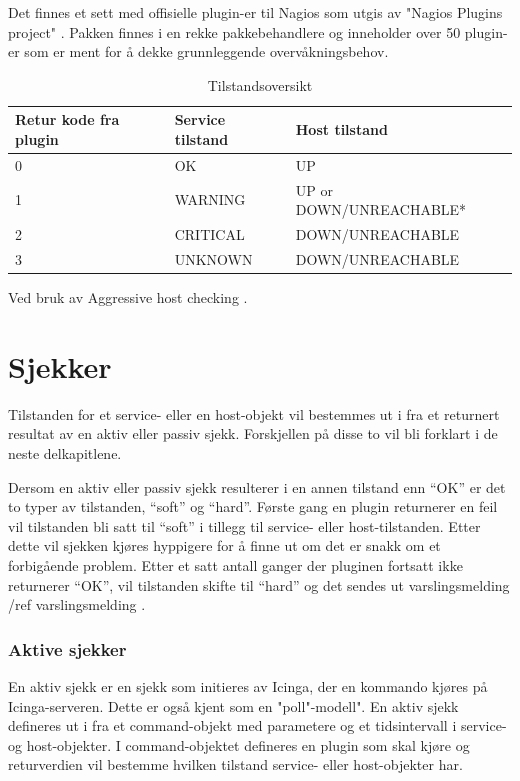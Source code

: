 Det finnes et sett med offisielle plugin-er til Nagios som utgis av "Nagios Plugins project" \cite{http://nagiosplugins.org}. Pakken finnes i en rekke pakkebehandlere og inneholder over 50 plugin-er som er ment for å dekke grunnleggende overvåkningsbehov.

\begin{table}
	\begin{center}
	\begin{threeparttable}
	\begin{tabular}{ | l | l | l |} \hline
    \textbf{Retur kode fra plugin} & \textbf{Service tilstand} & \textbf{Host tilstand} \\ \hline
	0 & OK & UP \\ \hline
	1 & WARNING & UP or DOWN/UNREACHABLE* \\ \hline
	2 & CRITICAL & DOWN/UNREACHABLE \\ \hline
	3 & UNKNOWN & DOWN/UNREACHABLE \\ \hline

	\end{tabular}
	\begin{tablenotes}
	\small
	\item *Ved bruk av Aggressive host checking \cite{icingapluginapi}.
	\end{tablenotes}
	\caption{Tilstandsoversikt}
	\label{state}
	\end{threeparttable}
	\end{center}
\end{table}

\section{Sjekker}
Tilstanden for et service- eller en host-objekt vil bestemmes ut i fra et returnert resultat av en aktiv eller passiv sjekk. Forskjellen på disse to vil bli forklart i de neste delkapitlene.

Dersom en aktiv eller passiv sjekk resulterer i en annen tilstand enn “OK” er det to typer av tilstanden, “soft” og “hard”. Første gang en plugin returnerer en feil vil tilstanden bli satt til “soft” i tillegg til service- eller host-tilstanden. Etter dette vil sjekken kjøres hyppigere for å finne ut om det er snakk om et forbigående problem. Etter et satt antall ganger der pluginen fortsatt ikke returnerer “OK”, vil tilstanden skifte til “hard” og det sendes ut varslingsmelding /ref  varslingsmelding .

\subsubsection{Aktive sjekker}
En aktiv sjekk er en sjekk som initieres av Icinga, der en kommando kjøres på Icinga-serveren. Dette er også kjent som en "poll"-modell". En aktiv sjekk defineres ut i fra et command-objekt med parametere og et tidsintervall i service- og host-objekter. I command-objektet defineres en plugin som skal kjøre og returverdien vil bestemme hvilken tilstand service- eller host-objekter har. 

